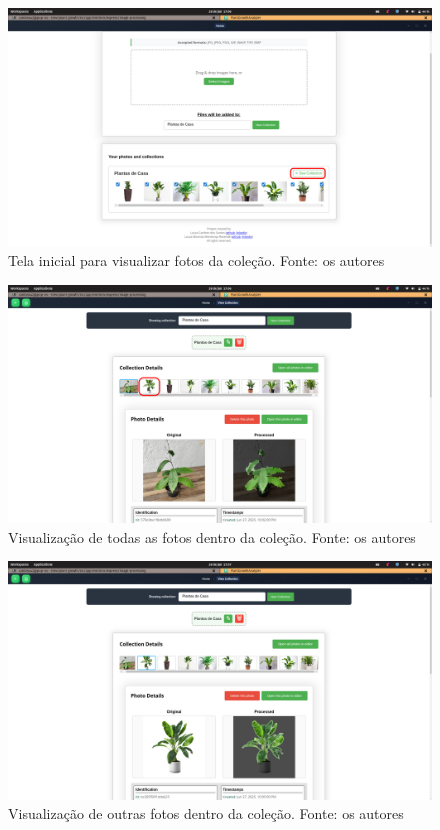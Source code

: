 \begin{figure}[H]
    \centering
    \includegraphics[width=1\textwidth]{../figures/screens/uc010/Screenshot from 2025-06-28 17-06-32.png}
    \caption{Tela inicial para visualizar fotos da coleção. Fonte: os autores}
    \label{fig:uc010-screen1}
\end{figure}

\begin{figure}[H]
    \centering
    \includegraphics[width=1\textwidth]{../figures/screens/uc010/Screenshot from 2025-06-28 17-06-44.png}
    \caption{Visualização de todas as fotos dentro da coleção. Fonte: os autores}
    \label{fig:uc010-screen2}
\end{figure}

\begin{figure}[H]
    \centering
    \includegraphics[width=1\textwidth]{../figures/screens/uc010/Screenshot from 2025-06-28 17-07-14.png}
    \caption{Visualização de outras fotos dentro da coleção. Fonte: os autores}
    \label{fig:uc010-screen3}
\end{figure}

